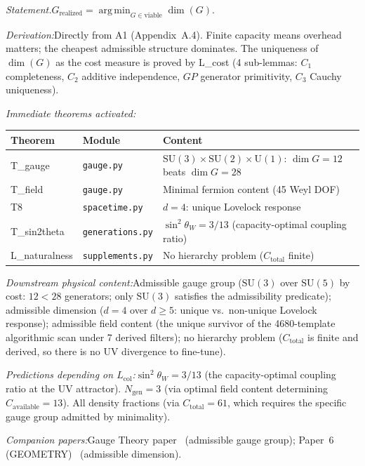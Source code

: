 \documentclass[11pt]{article}
\newcommand{\Ctot}{C_{\mathrm{total}}}
\newcommand{\sw}{\sin^2\!\theta_W}
\newcommand{\Ngen}{N_{\mathrm{gen}}}
\newcommand{\Lcol}{L_{\mathrm{col}}}
\newcommand{\SU}{\mathrm{SU}}
\newcommand{\U}{\mathrm{U}}
\DeclareMathOperator*{\argmin}{arg\,min}
\begin{document}
\begin{tcolorbox}[apfbox, title={$\Lcol$ $\longrightarrow$ Minimum-Cost Structure (the admissibility argmin)}]
\textit{Statement.}\quad $G_{\mathrm{realized}} = \argmin_{G \in \mathrm{viable}} \dim(G)$.

\textit{Derivation:}\quad Directly from A1 (Appendix~A.4).  Finite capacity means overhead matters; the cheapest admissible structure dominates.  The uniqueness of $\dim(G)$ as the cost measure is proved by L\_cost (4 sub-lemmas: $C_1$ completeness, $C_2$ additive independence, $GP$ generator primitivity, $C_3$ Cauchy uniqueness).

\smallskip\noindent\textit{Immediate theorems activated:}
\begin{center}
\small
\renewcommand{\arraystretch}{1.15}
\begin{tabular}{lll}
\toprule
\textbf{Theorem} & \textbf{Module} & \textbf{Content} \\
\midrule
T\_gauge & \texttt{gauge.py} & $\SU(3)\!\times\!\SU(2)\!\times\!\U(1)$: $\dim G = 12$ beats $\dim G = 28$ \\
T\_field & \texttt{gauge.py} & Minimal fermion content (45 Weyl DOF) \\
T8 & \texttt{spacetime.py} & $d = 4$: unique Lovelock response \\
T\_sin2theta & \texttt{generations.py} & $\sw = 3/13$ (capacity-optimal coupling ratio) \\
L\_naturalness & \texttt{supplements.py} & No hierarchy problem ($\Ctot$ finite) \\
\bottomrule
\end{tabular}
\end{center}

\smallskip\noindent\textit{Downstream physical content:}\quad Admissible gauge group ($\SU(3)$ over $\SU(5)$ by cost: $12 < 28$ generators; only $\SU(3)$ satisfies the admissibility predicate); admissible dimension ($d = 4$ over $d \ge 5$: unique vs.\ non-unique Lovelock response); admissible field content (the unique survivor of the 4680-template algorithmic scan under 7 derived filters); no hierarchy problem ($\Ctot$ is finite and derived, so there is no UV divergence to fine-tune).

\smallskip\noindent\textit{Predictions depending on $\Lcol$:}\quad $\sw = 3/13$ (the capacity-optimal coupling ratio at the UV attractor).  $\Ngen = 3$ (via optimal field content determining $C_{\mathrm{available}} = 13$).  All density fractions (via $\Ctot = 61$, which requires the specific gauge group admitted by minimality).

\smallskip\noindent\textit{Companion papers:}\quad Gauge Theory paper~\cite{PGT} (admissible gauge group); Paper~6 (GEOMETRY)~\cite{P6} (admissible dimension).
\end{tcolorbox}
\end{document}
